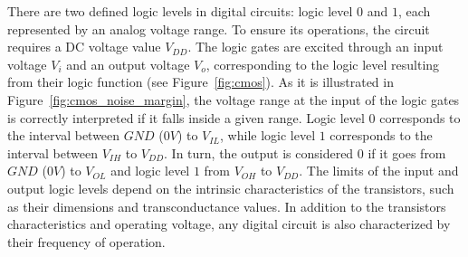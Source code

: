 There are two defined logic levels in digital circuits: logic level $0$ and $1$, each represented by an analog voltage range. To ensure its operations, the circuit requires a DC voltage value $V_{DD}$. The logic gates are excited through an input voltage $V_{i}$ and an output voltage $V_o$, corresponding to the logic level resulting from their logic function (see Figure~\ref{fig:cmos}). As it is illustrated in Figure~\ref{fig:cmos_noise_margin}, the voltage range at the input of the logic gates is correctly interpreted if it falls inside a given range. Logic level $0$ corresponds to the interval between $GND$ ($0V$) to $V_{IL}$, while logic level $1$ corresponds to the interval between $V_{IH}$ to $V_{DD}$. In turn, the output is considered $0$ if it goes from $GND$ ($0V$) to $V_{OL}$ and logic level $1$ from $V_{OH}$ to $V_{DD}$. The limits of the input and output logic levels depend on the intrinsic characteristics of the transistors, such as their dimensions and transconductance values. In addition to the transistors characteristics and operating voltage, any digital circuit is also characterized by their frequency of operation.




